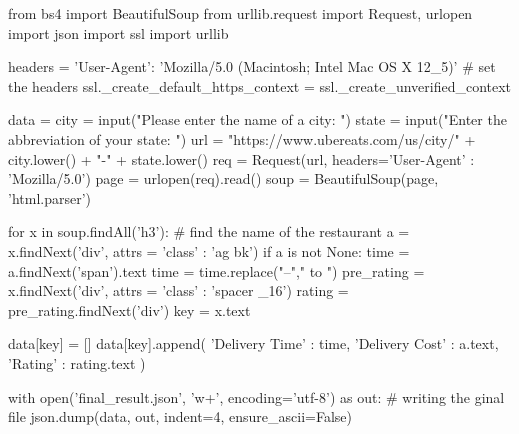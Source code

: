 from bs4 import BeautifulSoup
from urllib.request import Request, urlopen
import json
import ssl
import urllib

headers = {'User-Agent': 'Mozilla/5.0 (Macintosh; Intel Mac OS X 12_5)'} # set the headers
ssl._create_default_https_context = ssl._create_unverified_context

data = {}
city = input("Please enter the name of a city: ")
state = input("Enter the abbreviation of your state: ")
url = "https://www.ubereats.com/us/city/" + city.lower() + "-" + state.lower()
req = Request(url, headers={'User-Agent' : 'Mozilla/5.0'})
page = urlopen(req).read()
soup = BeautifulSoup(page, 'html.parser')

for x in soup.findAll('h3'): # find the name of the restaurant
    a = x.findNext('div', attrs = {'class' : 'ag bk'})
    if a is not None:
        time = a.findNext('span').text
        time = time.replace("–"," to ")
        pre_rating = x.findNext('div', attrs = {'class' : 'spacer _16'})
        rating = pre_rating.findNext('div')
        key = x.text
       
        data[key] = []
        data[key].append({
            'Delivery Time' : time,
            'Delivery Cost' : a.text,
            'Rating' : rating.text
        })

with open('final_result.json', 'w+', encoding='utf-8') as out: # writing the ginal file
    json.dump(data, out, indent=4, ensure_ascii=False)
